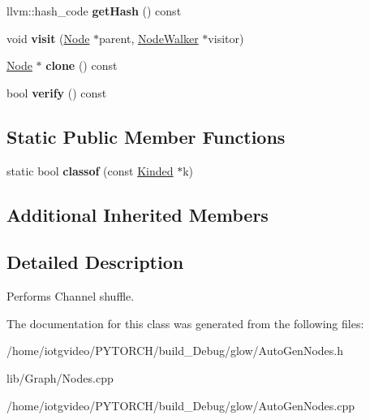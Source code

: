 \begin{DoxyCompactItemize}
\mbox{\label{classglow_1_1_channel_shuffle_node_a428cff14a94dd954a343689d2938bcbd}} 
llvm\+::hash\+\_\+code {\bfseries get\+Hash} () const
\item 
\mbox{\label{classglow_1_1_channel_shuffle_node_a8143f3373450653961ea170a684fd907}} 
void {\bfseries visit} (\hyperlink{classglow_1_1_node}{Node} $\ast$parent, \hyperlink{classglow_1_1_node_walker}{Node\+Walker} $\ast$visitor)
\item 
\mbox{\label{classglow_1_1_channel_shuffle_node_a8e9f0644b2dd03e85eb6fea2171e73d5}} 
\hyperlink{classglow_1_1_node}{Node} $\ast$ {\bfseries clone} () const
\item 
\mbox{\label{classglow_1_1_channel_shuffle_node_a8151455243ac7f0f42ebfc5d8a4b8bf9}} 
bool {\bfseries verify} () const
\end{DoxyCompactItemize}
\subsection*{Static Public Member Functions}
\begin{DoxyCompactItemize}
\item 
\mbox{\label{classglow_1_1_channel_shuffle_node_a2465b6eb0fab0e097d1c53753d9bb0e8}} 
static bool {\bfseries classof} (const \hyperlink{classglow_1_1_kinded}{Kinded} $\ast$k)
\end{DoxyCompactItemize}
\subsection*{Additional Inherited Members}


\subsection{Detailed Description}
Performs Channel shuffle. 

The documentation for this class was generated from the following files\+:\begin{DoxyCompactItemize}
\item 
/home/iotgvideo/\+P\+Y\+T\+O\+R\+C\+H/build\+\_\+\+Debug/glow/Auto\+Gen\+Nodes.\+h\item 
lib/\+Graph/Nodes.\+cpp\item 
/home/iotgvideo/\+P\+Y\+T\+O\+R\+C\+H/build\+\_\+\+Debug/glow/Auto\+Gen\+Nodes.\+cpp\end{DoxyCompactItemize}

